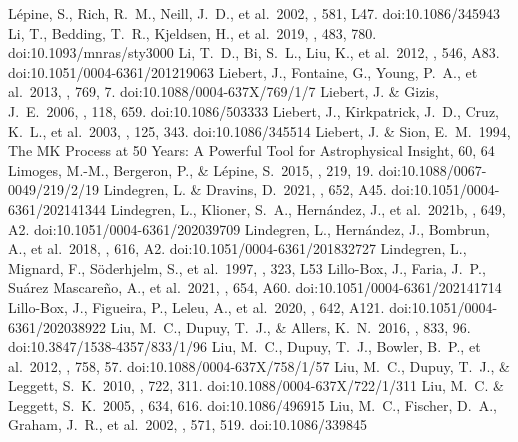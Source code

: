 \documentclass[twocolumn,tighten,twocolappendix]{aastex631}
\begin{document}
\begin{thebibliography}{}
 L{\'e}pine, S., Rich, R.~M., Neill, J.~D., et al.\ 2002, \apjl, 581, L47. doi:10.1086/345943
 Li, T., Bedding, T.~R., Kjeldsen, H., et al.\ 2019, \mnras, 483, 780. doi:10.1093/mnras/sty3000
 Li, T.~D., Bi, S.~L., Liu, K., et al.\ 2012, \aap, 546, A83. doi:10.1051/0004-6361/201219063
 Liebert, J., Fontaine, G., Young, P.~A., et al.\ 2013, \apj, 769, 7. doi:10.1088/0004-637X/769/1/7
 Liebert, J. \& Gizis, J.~E.\ 2006, \pasp, 118, 659. doi:10.1086/503333
 Liebert, J., Kirkpatrick, J.~D., Cruz, K.~L., et al.\ 2003, \aj, 125, 343. doi:10.1086/345514
 Liebert, J. \& Sion, E.~M.\ 1994, The MK Process at 50 Years:  A Powerful Tool for Astrophysical Insight, 60, 64
 Limoges, M.-M., Bergeron, P., \& L{\'e}pine, S.\ 2015, \apjs, 219, 19. doi:10.1088/0067-0049/219/2/19
 Lindegren, L. \& Dravins, D.\ 2021, \aap, 652, A45. doi:10.1051/0004-6361/202141344
 Lindegren, L., Klioner, S.~A., Hern{\'a}ndez, J., et al.\ 2021b, \aap, 649, A2. doi:10.1051/0004-6361/202039709
 Lindegren, L., Hern{\'a}ndez, J., Bombrun, A., et al.\ 2018, \aap, 616, A2. doi:10.1051/0004-6361/201832727
 Lindegren, L., Mignard, F., S{\"o}derhjelm, S., et al.\ 1997, \aap, 323, L53
 Lillo-Box, J., Faria, J.~P., Su{\'a}rez Mascare{\~n}o, A., et al.\ 2021, \aap, 654, A60. doi:10.1051/0004-6361/202141714
 Lillo-Box, J., Figueira, P., Leleu, A., et al.\ 2020, \aap, 642, A121. doi:10.1051/0004-6361/202038922
 Liu, M.~C., Dupuy, T.~J., \& Allers, K.~N.\ 2016, \apj, 833, 96. doi:10.3847/1538-4357/833/1/96
 Liu, M.~C., Dupuy, T.~J., Bowler, B.~P., et al.\ 2012, \apj, 758, 57. doi:10.1088/0004-637X/758/1/57
 Liu, M.~C., Dupuy, T.~J., \& Leggett, S.~K.\ 2010, \apj, 722, 311. doi:10.1088/0004-637X/722/1/311
 Liu, M.~C. \& Leggett, S.~K.\ 2005, \apj, 634, 616. doi:10.1086/496915
 Liu, M.~C., Fischer, D.~A., Graham, J.~R., et al.\ 2002, \apj, 571, 519. doi:10.1086/339845

\end{thebibliography}
\end{document}
